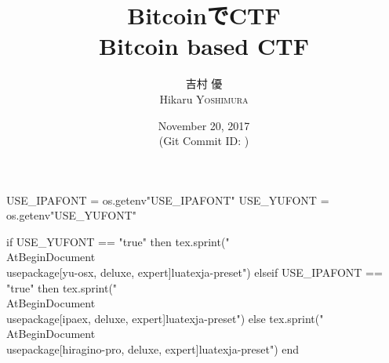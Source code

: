 \hypersetup{colorlinks,linkcolor=,urlcolor=links}

\beamertemplatenavigationsymbolsempty


\usepackage{luacode}
\usepackage{luatexja}
\usepackage{pgfpages}
\usepackage{fontspec}

\begin{luacode*}
  USE_IPAFONT = os.getenv"USE_IPAFONT"
  USE_YUFONT = os.getenv"USE_YUFONT"
  
  if USE_YUFONT == "true" then
    tex.sprint("\\AtBeginDocument{\\usepackage[yu-osx, deluxe, expert]{luatexja-preset}}")
  elseif USE_IPAFONT == "true" then
    tex.sprint("\\AtBeginDocument{\\usepackage[ipaex, deluxe, expert]{luatexja-preset}}")
  else
    tex.sprint("\\AtBeginDocument{\\usepackage[hiragino-pro, deluxe, expert]{luatexja-preset}}")
  end
\end{luacode*}


\usepackage{epigraph}
\usepackage{etoolbox}
\usepackage{tikz}
\usepackage{framed}
\usepackage[ss]{libertine}
\usepackage[libertine]{newtxmath}
\usepackage{amsmath}
\usepackage{mathtools}
\usepackage{listings}
\usepackage{caption}

\renewcommand{\kanjifamilydefault}{\gtdefault}



\setmonofont[Ligatures=TeX]{CMU Typewriter Text}



\title[BitcoinでCTF]{%
  BitcoinでCTF \\
  {\normalsize Bitcoin based CTF} 
}
\author[吉村 優]{%
  吉村 優 \\
  Hikaru \textsc{Yoshimura}
}
\date[November 20, 2017]{%
  November 20, 2017 \\%
  {\footnotesize (Git Commit ID: \href{https://github.com/y-yu/bitcoin-ctf-slide}{\GITAbrHash})}
}

